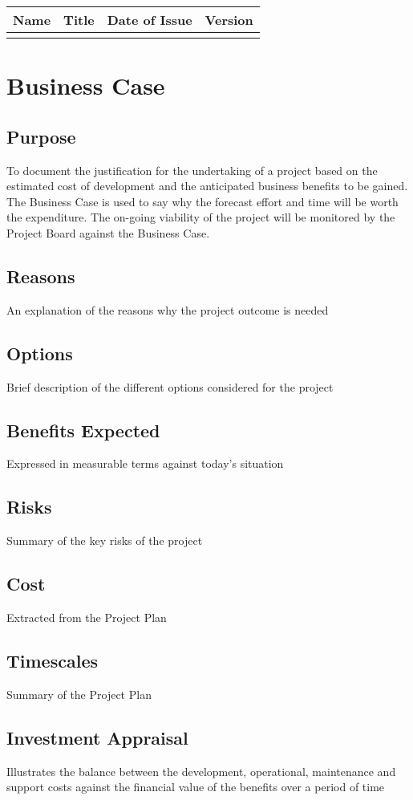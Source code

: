 \documentclass{report}
\begin{document}
\begin{center}
    \begin{tabular}{| p{2cm} | l | p{2cm} | p{2cm} |}
    \hline
    Name & Title & Date of Issue & Version \\
    \hline
     & & & \\
    \hline
    \end{tabular}
\end{center}

\tableofcontents

\chapter{Business Case}

\section{Purpose}
To document the justification for the undertaking of a project based on the estimated cost of development and the anticipated business benefits to be gained.  The Business Case is used to say why the forecast effort and time will be worth the expenditure.  The on-going viability of the project will be monitored by the Project Board against the Business Case.

\section{Reasons}
An explanation of the reasons why the project outcome is needed

\section{Options}
Brief description of the different options considered for the project

\section{Benefits Expected}
Expressed in measurable terms against today's situation

\section{Risks}
Summary of the key risks of the project

\section{Cost}
Extracted from the Project Plan

\section{Timescales}
Summary of the Project Plan

\section{Investment Appraisal}
Illustrates the balance between the development, operational, maintenance and support costs against the financial value of the benefits over a period of time
\end{document}
